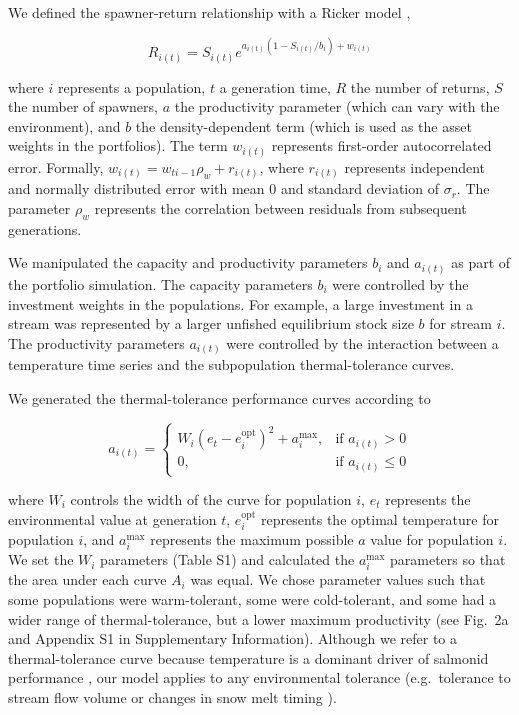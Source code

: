We defined the spawner-return relationship with a Ricker model \citep{ricker1954},

\[R_{i(t)} = S_{i(t)}e^{a_{i(t)}(1-S_{i(t)}/b_i) + w_{i(t)}}\]

\noindent where $i$ represents a population, $t$ a generation time, $R$ the number of returns, $S$ the number of spawners, $a$ the productivity parameter (which can vary with the environment), and $b$ the density-dependent term (which is used as the asset weights in the portfolios). The term $w_{i(t)}$ represents first-order autocorrelated error. Formally, $w_{i(t)} = w_{ti-1} \rho_w + r_{i(t)}$, where $r_{i(t)}$ represents independent and normally distributed error with mean 0 and standard deviation of $\sigma_r$. The parameter $\rho_w$ represents the correlation between residuals from subsequent generations.

We manipulated the capacity and productivity parameters $b_i$ and $a_{i(t)}$ as part of the portfolio simulation. The capacity parameters $b_i$ were controlled by the investment weights in the populations. For example, a large investment in a stream was represented by a larger unfished equilibrium stock size $b$ for stream $i$. The productivity parameters $a_{i(t)}$ were controlled by the interaction between a temperature time series and the subpopulation thermal-tolerance curves.

We generated the thermal-tolerance performance curves according to

\[a_{i(t)} =
  \begin{cases}
    W_i (e_t - e_i^{\mathrm{opt}})^2 + a_i^{\mathrm{max}},
      & \text{if } a_{i(t)} > 0\\
      0, & \text{if } a_{i(t)} \leq 0
  \end{cases}\]

\noindent where $W_i$ controls the width of the curve for population $i$, $e_t$ represents the environmental value at generation $t$, $e_i^{\mathrm{opt}}$ represents the optimal temperature for population $i$, and $a_i^{\mathrm{max}}$ represents the maximum possible $a$ value for population $i$. We set the $W_i$ parameters (Table S1) and calculated the $a_i^{\mathrm{max}}$ parameters so that the area under each curve $A_i$ was equal. We chose parameter values such that some populations were warm-tolerant, some were cold-tolerant, and some had a wider range of thermal-tolerance, but a lower maximum productivity (see Fig.~2a and Appendix S1 in Supplementary Information). Although we refer to a thermal-tolerance curve because temperature is a dominant driver of salmonid performance \citep{mccullough1999}, our model applies to any environmental tolerance (e.g.~tolerance to stream flow volume or changes in snow melt timing \citep{crozier2008}).

